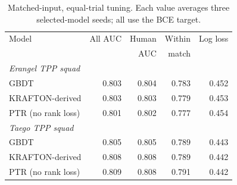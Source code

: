 \begin{table}[t]
\centering\footnotesize
\caption{Matched-input, equal-trial tuning. Each value averages three selected-model seeds; all use the BCE target.}
\label{tab:tuning}
\setlength{\tabcolsep}{3pt}
\begin{tabular}{lrrrr}
\toprule
Model & All AUC & Human & Within & Log loss \\
 & & AUC & match & \\
\midrule
\multicolumn{5}{l}{\emph{Erangel TPP squad}} \\
GBDT & 0.803 & 0.804 & 0.783 & 0.452 \\
KRAFTON-derived & 0.803 & 0.803 & 0.779 & 0.453 \\
PTR (no rank loss) & 0.801 & 0.802 & 0.777 & 0.454 \\
\multicolumn{5}{l}{\emph{Taego TPP squad}} \\
GBDT & 0.805 & 0.805 & 0.789 & 0.443 \\
KRAFTON-derived & 0.808 & 0.808 & 0.789 & 0.442 \\
PTR (no rank loss) & 0.809 & 0.808 & 0.791 & 0.442 \\
\bottomrule
\end{tabular}
\end{table}
